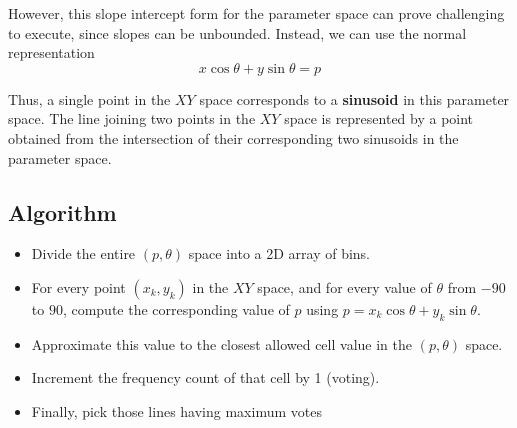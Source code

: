 \documentclass{report}
\begin{document}
However, this slope intercept form for the parameter space can prove challenging to execute, since slopes can be unbounded. Instead, we can use the normal representation
$$
  x\cos\theta + y\sin\theta = p
$$

Thus, a single point in the $XY$ space corresponds to a \textbf{sinusoid} in this parameter space. The line joining two points in the $XY$ space is represented by a point obtained from the intersection of their corresponding two sinusoids in the parameter space.

\subsection{Algorithm}
\begin{itemize}
  \setlength\itemsep{0mm}
  \item Divide the entire $(p,\theta)$ space into a 2D array of bins.
  \item For every point $(x_k,y_k)$ in the $XY$ space, and for every value of $\theta$ from $-90$ to $90$, compute the corresponding value of $p$ using $p = x_k\cos\theta + y_k\sin\theta$.
  \item Approximate this value to the closest allowed cell value in the $(p,\theta)$ space.
  \item Increment the frequency count of that cell by 1 (voting).
  \item Finally, pick those lines having maximum votes
\end{itemize}
\vspace{4mm}
\end{document}
